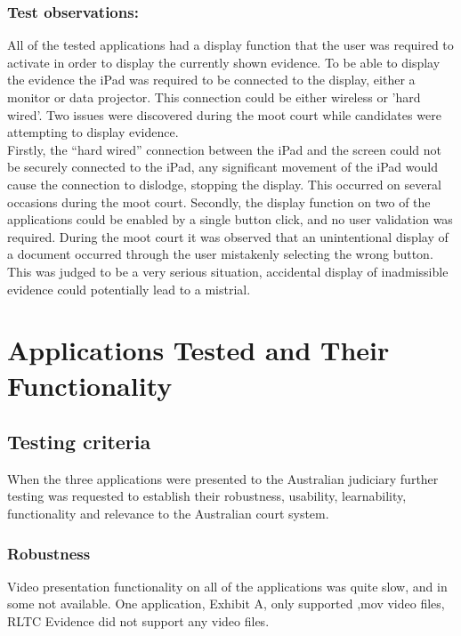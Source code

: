 \subsubsection{Test observations:}
All of the tested applications had a display function that the user was required to activate in order to display the currently shown evidence. To be able to display the evidence the iPad was required to be connected to the display, either a monitor or data projector. This connection could be either wireless or 'hard wired'. Two issues were discovered during the moot court while candidates were attempting to display evidence. \\
Firstly, the ``hard wired'' connection between the iPad and the screen could not be securely connected to the iPad, any significant movement of the iPad would cause the connection to dislodge, stopping the display. This occurred on several occasions during the moot court.
Secondly, the display function on two of the applications could be enabled by a single button click, and no user validation was required. During the moot court it was observed that an unintentional display of a document occurred through the user mistakenly selecting the wrong button. This was judged to be a very serious situation, accidental display of inadmissible evidence could potentially lead to a mistrial.

\section{Applications Tested and Their Functionality}
\subsection{Testing criteria}
When the three applications were presented to the Australian judiciary further testing was requested to establish their robustness, usability, learnability, functionality and relevance to the Australian court system.
\subsubsection{Robustness}
Video presentation functionality on all of the applications was quite slow, and in some not available. One application, Exhibit A, only supported ,mov video files, RLTC Evidence did not support any video files.
